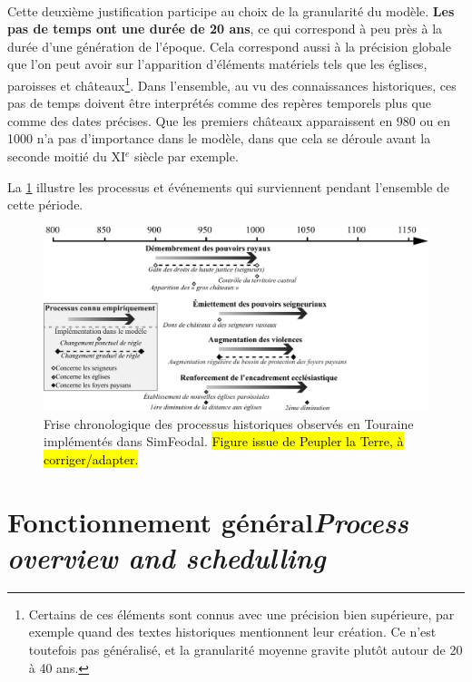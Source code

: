 \paragraph[Pas de temps de 20 ans]{} Cette deuxième justification participe au choix de la granularité du modèle. \textbf{Les pas de temps ont une durée de 20 ans}, ce qui correspond à peu près à la durée d'une génération de l'époque.
Cela correspond aussi à la précision globale que l'on peut avoir sur l'apparition d'éléments matériels tels que les églises, paroisses et châteaux\footnote{
Certains de ces éléments sont connus avec une précision bien supérieure, par exemple quand des textes historiques mentionnent leur création.
Ce n'est toutefois pas généralisé, et la granularité moyenne gravite plutôt autour de 20 à 40 ans.
}.
Dans l'ensemble, au vu des connaissances historiques, ces pas de temps doivent être interprétés comme des repères temporels plus que comme des dates précises. 
Que les premiers châteaux apparaissent en 980 ou en 1000 n'a pas d'importance dans le modèle, dans que cela se déroule avant la seconde moitié du XI$^e$ siècle par exemple.


La \cref{fig:frise-chrono} illustre les processus et événements qui surviennent pendant l'ensemble de cette période.

\begin{figure}[H]
	\centering
	\includegraphics[width=\linewidth]{img/frise_chrono_tmd.pdf}
	\caption{Frise chronologique des processus historiques observés en Touraine implémentés dans SimFeodal. \hl{Figure issue de Peupler la Terre, à corriger/adapter.}}
	\label{fig:frise-chrono}
\end{figure}



\let\orisectionmark\sectionmark
\renewcommand\sectionmark[1]{}%
\section[Fonctionnement général -- \textit{Process overview and schedulling}]{Fonctionnement général\protect\newline \large{\textit{Process overview and schedulling}}\label{sec:fonctionnement-general}}
\orisectionmark{Fonctionnement général}
\let\sectionmark\orisectionmark

